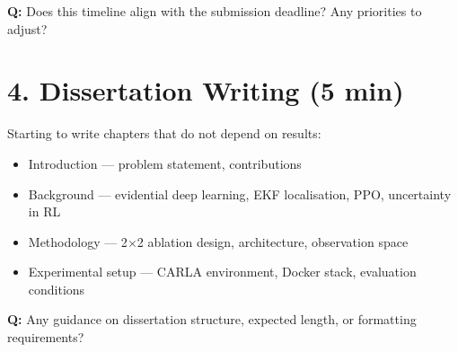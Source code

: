 \documentclass[11pt,a4paper]{article}
\newcommand{\question}[1]{\textcolor{question}{\textbf{Q:}} #1}
\begin{document}
\question{Does this timeline align with the submission deadline? Any priorities to adjust?}

\section*{4. Dissertation Writing (5 min)}

Starting to write chapters that do not depend on results:

\begin{itemize}[leftmargin=*]
  \item Introduction --- problem statement, contributions
  \item Background --- evidential deep learning, EKF localisation, PPO, uncertainty in RL
  \item Methodology --- 2$\times$2 ablation design, architecture, observation space
  \item Experimental setup --- CARLA environment, Docker stack, evaluation conditions
\end{itemize}

\question{Any guidance on dissertation structure, expected length, or formatting requirements?}
\end{document}
